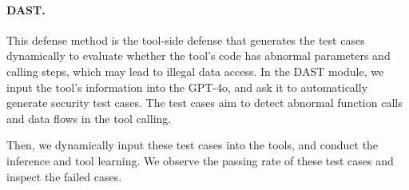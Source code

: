 \paragraph{DAST.}
This defense method is the tool-side defense that generates the test cases dynamically to evaluate whether the tool's code has abnormal parameters and calling steps, which may lead to illegal data access.
In the DAST module, we input the tool's information into the GPT-4o, and ask it to automatically generate security test cases. The test cases aim to detect abnormal function calls and data flows in the tool calling.

Then, we dynamically input these test cases into the tools, and conduct the inference and tool learning. We observe the passing rate of these test cases and inspect the failed cases. 